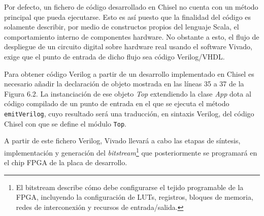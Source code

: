 Por defecto, un fichero de código desarrollado en Chisel no cuenta con un método principal que pueda ejecutarse. Esto es así puesto que la finalidad del código es solamente describir, por medio de constructos propios del lenguaje Scala, el comportamiento interno de componentes hardware. No obstante a esto, el flujo de despliegue de un circuito digital sobre hardware real usando el software Vivado, exige que el punto de entrada de dicho flujo sea código Verilog/VHDL.

Para obtener código Verilog a partir de un desarrollo implementado en Chisel \cite{chisel-to-verilog} es necesario añadir la declaración de objeto mostrada en las líneas 35 a 37 de la Figura 6.2. La instanciación de ese objeto \textit{Top} extendiendo la clase \textit{App} dota al código compilado de un punto de entrada en el que se ejecuta el método \texttt{emitVerilog}, cuyo resultado será una traducción, en sintaxis Verilog, del código Chisel con que se define el módulo \texttt{Top}.

A partir de este fichero Verilog, Vivado llevará a cabo las etapas de síntesis, implementación y generación del \textit{bitstream}\footnote{El bitstream describe cómo debe configurarse el tejido programable de la FPGA, incluyendo la configuración de LUTs, registros, bloques de memoria, redes de interconexión y recursos de entrada/salida.} que posteriormente se programará en el chip FPGA de la placa de desarrollo.

